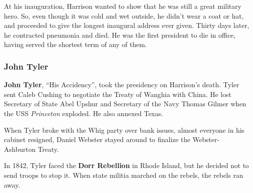 At his inauguration, Harrison wanted to show that he was still a great military hero.
So, even though it was cold and wet outside, he didn't wear a coat or hat,
and proceeded to give the longest inaugural address ever given.
Thirty days later, he contracted pneumonia and died.
He was the first president to die in office, having served the shortest term of any of them.

\subsubsection*{John Tyler}

\textbf{John Tyler}, ``His Accidency'', took the presidency on Harrison's death.
Tyler sent Caleb Cushing to negotiate the Treaty of Wanghia with China.
He lost Secretary of State Abel Upshur and Secretary of the Navy Thomas Gilmer
when the USS \textit{Princeton} exploded.
He also annexed Texas.

When Tyler broke with the Whig party over bank issues, almost everyone in his cabinet resigned,
Daniel Webster stayed around to finalize the Webster-Ashburton Treaty.

In 1842, Tyler faced the \textbf{Dorr Rebellion} in Rhode Island, but he decided not to send troops to stop it.
When state militia marched on the rebels, the rebels ran away.
